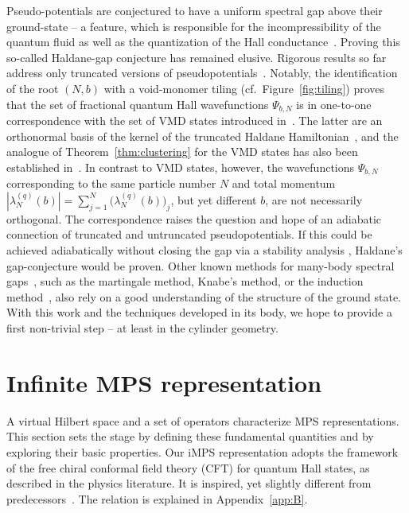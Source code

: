 \documentclass[letterpaper, DIV=17]{scrartcl}
\numberwithin{equation}{section}
\theoremstyle{definition}
\begin{document}
Pseudo-potentials are conjectured to have a uniform spectral gap above their ground-state -- a feature, which is responsible for the incompressibility of the quantum fluid \cite{Roug19, nachtergaele2021spectral} as well as the quantization of the Hall conductance~\cite{A7_hastings:2015, A7_Bachmann:2018lb, A7_Bachmann:2021dp}. Proving this so-called Haldane-gap conjecture has remained elusive. Rigorous results 
so far address only truncated versions of pseudopotentials~\cite{nachtergaele2021spectral,warze2022spectral,warzel2023bulk,A7_Y24}. 
Notably, the identification of the root $ (N,b) $ with a void-monomer tiling (cf.~Figure~\ref{fig:tiling}) proves that the set of  fractional quantum Hall wavefunctions $ \Psi_{b,N} $ 
 is in one-to-one correspondence with the set of VMD states introduced in~\cite{nachtergaele2021spectral,nachtergaele2020low}. The latter are an orthonormal basis of the kernel of the truncated Haldane Hamiltonian~\cite{Bergholtz:2005pl,nachtergaele2021spectral}, and the analogue of Theorem~\ref{thm:clustering} for the VMD states has also been established in~\cite{nachtergaele2021spectral}.   In contrast to VMD states, however, the wavefunctions $ \Psi_{b,N} $ corresponding to the same particle number $ N $ and total momentum $ |  \lambda^{(q)}_N(b)  | = \sum_{j=1}^N \big( \lambda^{(q)}_N(b)\big)_{j }  $, but yet different $ b $, are not necessarily orthogonal. 
 The correspondence raises the question and hope of an adiabatic connection of truncated and untruncated pseudopotentials. If this could be achieved adiabatically without closing the gap via a stability analysis \cite{BHM10,A7_NSY20}, Haldane's gap-conjecture would be proven. Other known methods for many-body spectral gaps~\cite{Young25}, such as the martingale method, Knabe's method, or the induction method~\cite{LNWY25}, also rely on a good understanding of the structure of the ground state.  With this work and the techniques developed in its body, we hope to provide a first non-trivial step -- at least in the cylinder geometry. 


 

\section{Infinite MPS representation}\label{sec:iMPS}

		
	A virtual Hilbert space and a set of operators characterize MPS representations. This section sets the stage by defining these fundamental quantities and by exploring their basic properties. 
	Our iMPS representation adopts the framework of the free chiral conformal field theory (CFT) for quantum Hall states, as described in the physics literature. It is inspired, yet slightly different from predecessors~\cite{estienne2013fractional}. The relation is explained in Appendix~\ref{app:B}.
\end{document}
